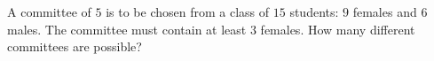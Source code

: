 A committee of $5$ is to be chosen from a class of $15$ students: $9$ females and $6$ males. The committee must contain at least $3$ females. How many different committees are possible?
